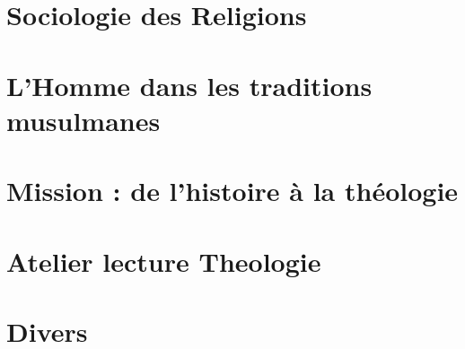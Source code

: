 \documentclass[oneside,10pt]{book}
\begin{document}
 







\setcounter{page}{1}
 



%
%

% 
%
%
%

%
%

% 
 
 
 
 
\part{Sociologie des Religions}
 
 
 
  \part{L'Homme dans les traditions musulmanes}
 
 
 
 \part{Mission : de l'histoire à la théologie}
 
 
  
 

 
 
  \part{Atelier lecture Theologie}
 
 
  
  

 
 \part{Divers}



 
 


%

\printbibliography

%
\end{document}
